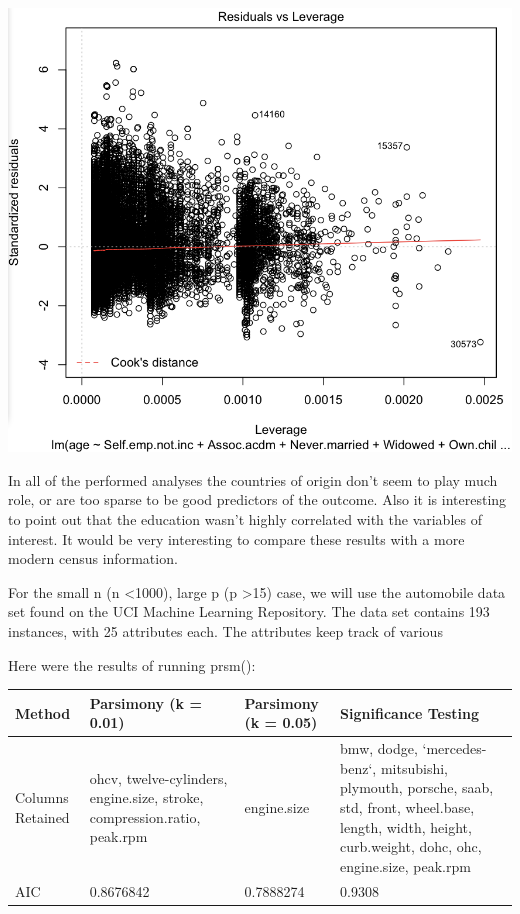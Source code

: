 \documentclass[letter]{article}
\begin{document}
 \includegraphics[scale=0.5]{cookResidCensus.png}

In all of the performed analyses the countries of origin don't seem to play much role, or are too sparse to be good predictors of the outcome. Also it is interesting to point out that the education wasn't highly correlated with the variables of interest. It would be very interesting to compare these results with a more modern census information.

\newpage


For the small n (n \textless 1000), large p (p \textgreater 15) case, we will use the automobile data set found on the UCI Machine Learning Repository.  The data set contains 193 instances, with 25 attributes each.  The attributes keep track of various 

Here were the results of running prsm(): \\

\begin{center}
    \begin{tabular}{ | l |  p{4cm} |  p{4cm} | p{4cm} |}
    \hline
    Method & Parsimony (k = 0.01) & Parsimony (k = 0.05) & Significance Testing \\ \hline
    
    Columns Retained & ohcv, twelve-cylinders, engine.size, stroke, compression.ratio, peak.rpm & engine.size & bmw, dodge, `mercedes-benz`, mitsubishi, plymouth, porsche, saab, std, front, wheel.base, length, width, height, curb.weight, dohc, ohc, engine.size, peak.rpm\\ \hline
    
    AIC & 0.8676842 & 0.7888274 & 0.9308\\ \hline
    
    \end{tabular}
\end{center}
\end{document}
